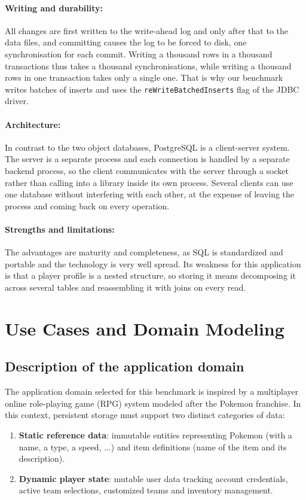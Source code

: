 \documentclass{article}
\begin{document}
\paragraph{Writing and durability:} All changes are first written to the
write-ahead log and only after that to the data files, and committing causes the
log to be forced to disk, one synchronisation for each commit. Writing a thousand
rows in a thousand transactions thus takes a thousand synchronisations, while
writing a thousand rows in one transaction takes only a single one. That is why
our benchmark writes batches of inserts and uses the
\texttt{reWriteBatchedInserts} flag of the JDBC driver.

\paragraph{Architecture:} In contrast to the two object databases, PostgreSQL is
a client-server system. The server is a separate process and each connection is
handled by a separate backend process, so the client communicates with the server
through a socket rather than calling into a library inside its own process.
Several clients can use one database without interfering with each other, at the
expense of leaving the process and coming back on every operation.

\paragraph{Strengths and limitations:} The advantages are maturity and
completeness, as SQL is standardized and portable and the technology is
very well spread. Its weakness for this application is that a player profile is a
nested structure, so storing it means decomposing it across several tables and
reassembling it with joins on every read.

\section{Use Cases and Domain Modeling}
\label{sec:usecases}

\subsection{Description of the application domain}
The application domain selected for this benchmark is inspired by a multiplayer online role-playing game (RPG) system modeled after the Pokemon franchise. In this context, persistent storage must support two distinct categories of data:
\begin{enumerate}
    \item \textbf{Static reference data}: immutable entities representing Pokemon (with a name, a type, a speed, ...) and item definitions (name of the item and its description).
    \item \textbf{Dynamic player state}: mutable user data tracking account credentials, active team selections, customized teams and inventory management.
\end{enumerate}
\end{document}
